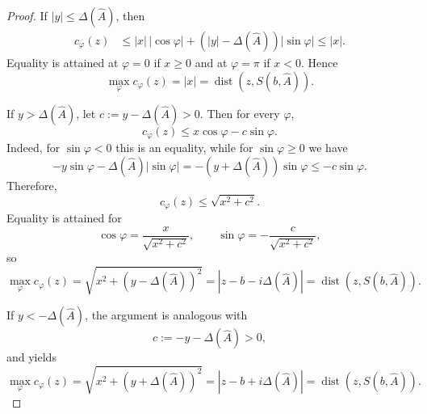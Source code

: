 \documentclass{SciPost}
\begin{document}
\begin{proof}
    If \(|y| \leqslant \Delta(\hat A)\), then
    \begin{equation}
        \begin{aligned}
            c_\varphi(z)
            &\leqslant
            |x|\,|\cos\varphi|
            +
            \left(
                |y|-\Delta(\hat A)
            \right)
            |\sin\varphi|
            \leqslant
            |x|.
        \end{aligned}
    \end{equation}
    Equality is attained at \(\varphi = 0\) if \(x \geqslant 0\) and at \(\varphi=\pi\) if \(x<0\). Hence
    \begin{equation}
        \max_{\varphi} c_\varphi(z)
        =
        |x|
        =
        \operatorname{dist}\left(
            z,
            S(b,\hat A)
        \right).
    \end{equation}

    If \(y > \Delta(\hat A)\), let \(c := y-\Delta(\hat A) > 0\). Then for every \(\varphi\),
    \begin{equation}
        c_\varphi(z)
        \leqslant
        x\cos\varphi - c\sin\varphi.
    \end{equation}
    Indeed, for \(\sin\varphi < 0\) this is an equality, while for \(\sin\varphi \geqslant 0\) we have
    \begin{equation}
        -y\sin\varphi - \Delta(\hat A)\left|\sin\varphi\right|
        =
        -(y+\Delta(\hat A))\sin\varphi
        \leqslant
        -c\sin\varphi.
    \end{equation}
    Therefore,
    \begin{equation}
        c_\varphi(z)
        \leqslant
        \sqrt{x^2 + c^2}.
    \end{equation}
    Equality is attained for
    \begin{equation}
        \cos\varphi = \frac{x}{\sqrt{x^2+c^2}},
        \qquad
        \sin\varphi = -\frac{c}{\sqrt{x^2+c^2}},
    \end{equation}
    so
    \begin{equation}
        \max_{\varphi} c_\varphi(z)
        =
        \sqrt{x^2 + \left(y-\Delta(\hat A)\right)^2}
        =
        \left|
            z - b - i\Delta(\hat A)
        \right|
        =
        \operatorname{dist}\left(
            z,
            S(b,\hat A)
        \right).
    \end{equation}

    If \(y < -\Delta(\hat A)\), the argument is analogous with
    \begin{equation}
        c := -y-\Delta(\hat A) > 0,
    \end{equation}
    and yields
    \begin{equation}
        \max_{\varphi} c_\varphi(z)
        =
        \sqrt{x^2 + \left(y+\Delta(\hat A)\right)^2}
        =
        \left|
            z - b + i\Delta(\hat A)
        \right|
        =
        \operatorname{dist}\left(
            z,
            S(b,\hat A)
        \right).
    \end{equation}


\end{proof}
\end{document}
